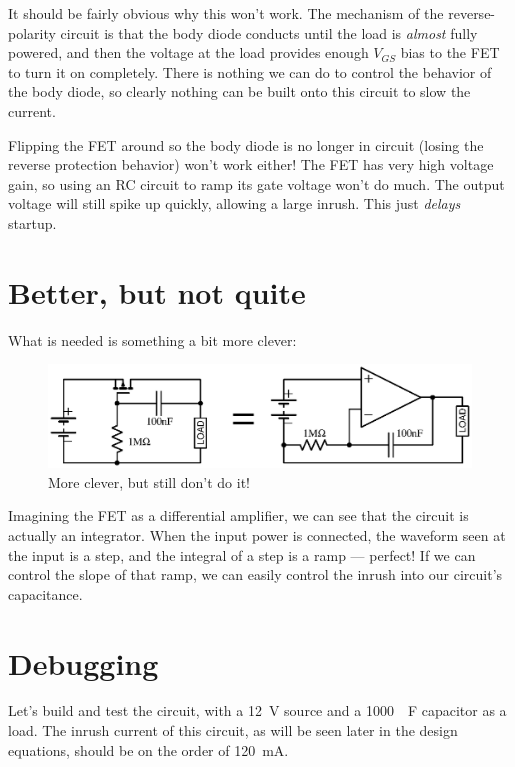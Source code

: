 \documentclass[letterpaper,12pt]{article}
\begin{document}
It should be fairly obvious why this won't work. The mechanism of the reverse-polarity circuit
is that the body diode conducts until the load is \emph{almost} fully powered, and then the
voltage at the load provides enough $V_{GS}$ bias to the FET to turn it on completely. There
is nothing we can do to control the behavior of the body diode, so clearly nothing can be
built onto this circuit to slow the current.

Flipping the FET around so the body diode is no longer in circuit (losing the reverse protection
behavior) won't work either! The FET has very high voltage gain, so using an RC circuit to
ramp its gate voltage won't do much. The output voltage will still spike up quickly, allowing
a large inrush. This just \emph{delays} startup.

\section{Better, but not quite}
\label{sec:better}

What is needed is something a bit more clever:

\begin{figure}[H]
\centering
\includegraphics{what_not_to_do_2}
\caption{More clever, but still don't do it!}
\end{figure}

Imagining the FET as a differential amplifier, we can see that the circuit is actually
an integrator. When the input power is connected, the waveform seen at the input is a
step, and the integral of a step is a ramp --- perfect! If we can control the slope of
that ramp, we can easily control the inrush into our circuit's capacitance.

\section{Debugging}
\label{sec:debugging}

Let's build and test the circuit, with a \SI{12}{V} source and a
\SI{1000}{\mu F} capacitor as a load. The
inrush current of this circuit, as will be seen later in the design equations, should
be on the order of \SI{120}{mA}.
\end{document}

